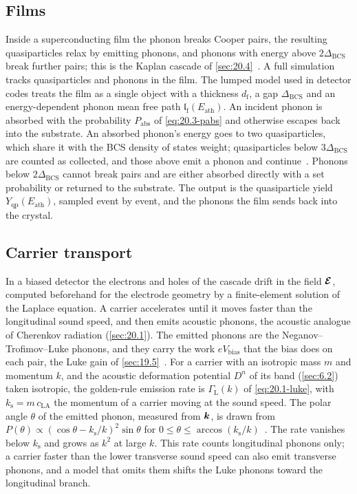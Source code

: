 \subsection{Films}

Inside a superconducting film the phonon breaks Cooper pairs, the resulting quasiparticles relax by emitting phonons, and phonons with energy above $2\Delta_{\mathrm{BCS}}$ break further pairs; this is the Kaplan cascade of \cref{sec:20.4}~\cite{kaplan1976quasiparticle}. A full simulation tracks quasiparticles and phonons in the film. The lumped model used in detector codes treats the film as a single object with a thickness $d_{\mathrm{f}}$, a gap $\Delta_{\mathrm{BCS}}$ and an energy-dependent phonon mean free path $\mathfrak{l}_{\mathrm{f}}(E_{\mathrm{ath}})$. An incident phonon is absorbed with the probability $P_{\mathrm{abs}}$ of \cref{eq:20.3-pabs} and otherwise escapes back into the substrate. An absorbed phonon's energy goes to two quasiparticles, which share it with the BCS density of states weight; quasiparticles below $3\Delta_{\mathrm{BCS}}$ are counted as collected, and those above emit a phonon and continue~\cite[Sect.~2.4]{kelsey2023g4cmp}. Phonons below $2\Delta_{\mathrm{BCS}}$ cannot break pairs and are either absorbed directly with a set probability or returned to the substrate. The output is the quasiparticle yield $Y_{\mathrm{qp}}(E_{\mathrm{ath}})$, sampled event by event, and the phonons the film sends back into the crystal.

\subsection{Carrier transport}

In a biased detector the electrons and holes of the cascade drift in the field $\bm{\mathcal{E}}$, computed beforehand for the electrode geometry by a finite-element solution of the Laplace equation. A carrier accelerates until it moves faster than the longitudinal sound speed, and then emits acoustic phonons, the acoustic analogue of Cherenkov radiation (\cref{sec:20.1}). The emitted phonons are the Neganov--Trofimov--Luke phonons, and they carry the work $eV_{\mathrm{bias}}$ that the bias does on each pair, the Luke gain of \cref{sec:19.5}~\cite{luke1988voltage}. For a carrier with an isotropic mass $m$ and momentum $k$, and the acoustic deformation potential $D^n$ of its band (\cref{sec:6.2}) taken isotropic, the golden-rule emission rate is $\varGamma_{\mathrm{L}}(k)$ of \cref{eq:20.1-luke}, with $k_{\mathrm{s}} = m\,c_{\mathrm{LA}}$ the momentum of a carrier moving at the sound speed. The polar angle $\theta$ of the emitted phonon, measured from $\bm{k}$, is drawn from $P(\theta) \propto (\cos\theta - k_{\mathrm{s}}/k)^2\sin\theta$ for $0 \le \theta \le \arccos(k_{\mathrm{s}}/k)$~\cite[Eq.~(9)]{kelsey2023g4cmp}. The rate vanishes below $k_{\mathrm{s}}$ and grows as $k^2$ at large $k$. This rate counts longitudinal phonons only; a carrier faster than the lower transverse sound speed can also emit transverse phonons, and a model that omits them shifts the Luke phonons toward the longitudinal branch.

